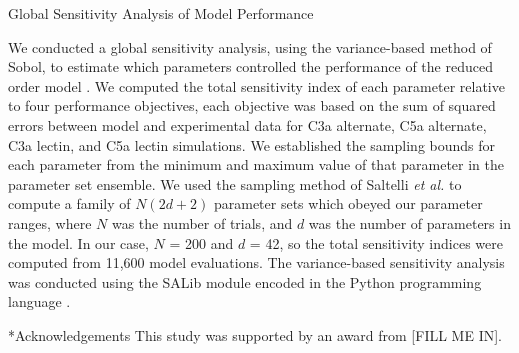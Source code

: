 \documentclass[12pt]{article}
\makeatletter
\renewcommand\subsection{\@startsection
	{subsection}{2}{0mm}
	{-0.05in}
	{-0.5\baselineskip}
	{\normalfont\normalsize\bfseries}}
\renewcommand\section{\@startsection
	{subsection}{2}{0mm}
	{-0.2in}
	{0.05\baselineskip}
	{\normalfont\large\bfseries}}
\makeatother
\begin{document}
\subsection{Global Sensitivity Analysis of Model Performance}

We conducted a global sensitivity analysis, using the variance-based method of Sobol, to estimate which parameters controlled the performance of the reduced order model \citep{SOBOL_METHOD}. 
We computed the total sensitivity index of each parameter relative to four performance objectives, each objective was based on the sum of squared errors between model and experimental data for C3a alternate, C5a alternate, C3a lectin, and C5a lectin simulations.
We established the sampling bounds for each parameter from the minimum and maximum value of that parameter in the parameter set ensemble. 
We used the sampling method of Saltelli \textit{et al.} \citep{Saltelli:2010} to compute a family of $N\left(2d+2\right)$ parameter sets which obeyed our parameter ranges, 
where $N$ was the number of trials, and $d$ was the number of parameters in the model. In our case, $N$ = 200 and $d$ = 42, so the total sensitivity indices were computed from
11,600 model evaluations. The variance-based sensitivity analysis was conducted using the SALib module encoded in the Python programming language \citep{SALIB}.

\clearpage


\section*{Acknowledgements}
This study was supported by an award from [FILL ME IN].
\clearpage




\clearpage

\end{document}
